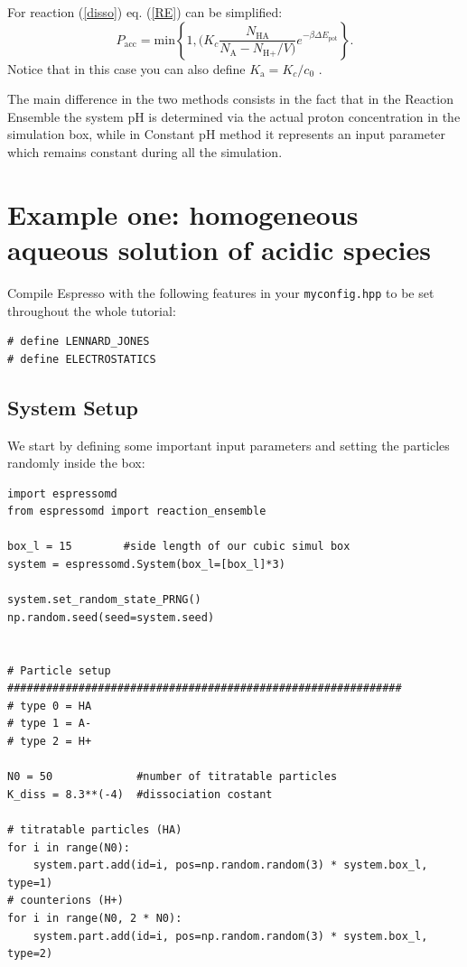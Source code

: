 \documentclass[
a4paper,                        %
11pt,                           %
twoside,                        %
footsepline,                    %
headsepline,                    %
headexclude,                    %
footexclude,                    %
pagesize,                       %
]{scrartcl}
\begin{document}
\noindent For reaction (\ref{disso}) eq. (\ref{RE}) can be simplified: 
\begin{equation}
P_{\text{acc}} = \text{min} \left\lbrace 1, (  K_c \frac{N_{\text{HA}}}{N_\text{A} - N_{\text{H}+}/V)} e^{-\beta \Delta E_\text{pot}}  \right\rbrace\text{.}
\end{equation}
Notice that in this case you can also define $K_\text{a} = K_c/c_0$ .

The main difference in the two methods consists in the fact that in the Reaction Ensemble the system pH is determined via the actual proton concentration in the simulation box, while in Constant pH method it represents an input parameter which remains constant during all the simulation.


\section{Example one: homogeneous aqueous solution of acidic species}

Compile Espresso with the following features in your
\texttt{myconfig.hpp} to be set throughout the whole tutorial:

\begin{verbatim}
# define LENNARD_JONES
# define ELECTROSTATICS
\end{verbatim}

\subsection{System Setup}

We start by defining some important input parameters and setting the particles randomly inside the box:
\begin{verbatim}
import espressomd
from espressomd import reaction_ensemble

box_l = 15        #side length of our cubic simul box
system = espressomd.System(box_l=[box_l]*3)

system.set_random_state_PRNG()
np.random.seed(seed=system.seed)


# Particle setup
#############################################################
# type 0 = HA
# type 1 = A-
# type 2 = H+

N0 = 50             #number of titratable particles
K_diss = 8.3**(-4)  #dissociation costant 
 
# titratable particles (HA)
for i in range(N0):
    system.part.add(id=i, pos=np.random.random(3) * system.box_l, type=1)
# counterions (H+)   
for i in range(N0, 2 * N0):
    system.part.add(id=i, pos=np.random.random(3) * system.box_l, type=2)
\end{verbatim}
\end{document}

